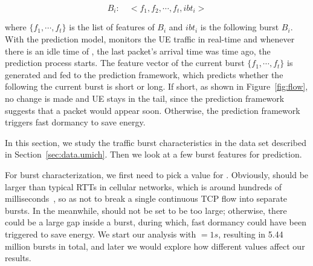 \begin{displaymath}
B_{i}:\quad <f_{1}, f_{2}, \cdots, f_{t}, ibt_{i}>
\end{displaymath}

where $\{f_{1}, \cdots, f_{t}\}$ is the list of features of $B_{i}$ and $ibt_{i}$ is the \IBT following burst $B_{i}$.
With the prediction model,  \NAME monitors the UE traffic in real-time and whenever there is an idle time of \BT, \ie the last packet's arrival time was \BT time ago, the prediction process starts. The feature vector of the current burst $\{f_{1}, \cdots, f_{t}\}$ is generated and fed to the prediction framework, which predicts whether the \IBT following the current burst is short or long. If short, as shown in Figure~\ref{fig:flow}, no change is made and UE stays in the tail, since the prediction framework suggests that a packet would appear soon. Otherwise, the prediction framework triggers fast dormancy to save energy.


\label{sec:stats}

In this section, we study the traffic burst characteristics in the \UMICH data set described in Section~\ref{sec:data.umich}. Then we look at a few burst features for \IBT prediction.

For burst characterization, we first need to pick a value for \BT. Obviously, \BT should be larger than typical RTTs in cellular networks, which is around hundreds of milliseconds~\cite{mobisys.3gtest, huang_mobisys12}, so as not to break a single continuous TCP flow into separate bursts. In the meanwhile, \BT should not be set to be too large; otherwise, there could be a large gap inside a burst, during which, fast dormancy could have been triggered to save energy. We start our analysis with \BT $= 1s$, resulting in 5.44 million bursts in total, and later we would explore how different \BT values affect our results.

\begin{figure}[t]
\centering
{} \\
\label{fig:cdf.ibt}
\end{figure}


